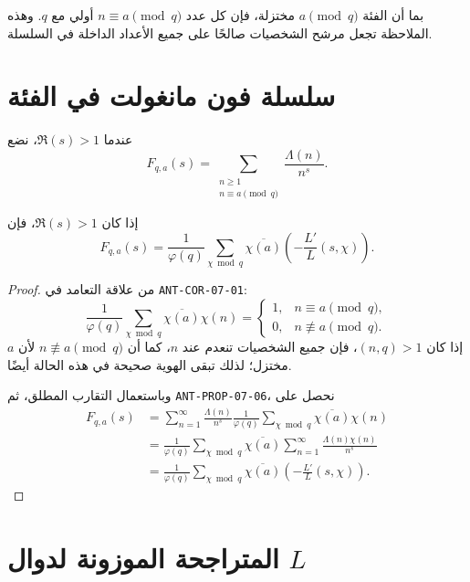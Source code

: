 بما أن الفئة \(a\pmod q\) مختزلة، فإن كل عدد \(n\equiv a\pmod q\)
أولي مع \(q\). وهذه الملاحظة تجعل مرشح الشخصيات صالحًا على جميع الأعداد
الداخلة في السلسلة.

\section{سلسلة فون مانغولت في الفئة}

عندما \(\Re(s)>1\)، نضع
\[
F_{q,a}(s)
=
\sum_{\substack{n\ge1\\n\equiv a\pmod q}}
\frac{\Lambda(n)}{n^s}.
\]

\begin{proposition}
\label{prop:class-von-mangoldt-dirichlet-series}
\provedhere
إذا كان \(\Re(s)>1\)، فإن
\[
F_{q,a}(s)
=
\frac1{\varphi(q)}
\sum_{\chi\bmod q}
\overline{\chi(a)}
\left(-\frac{L'}{L}(s,\chi)\right).
\]
\end{proposition}

\begin{proof}
من علاقة التعامد في \textenglish{\texttt{ANT-COR-07-01}}:
\[
\frac1{\varphi(q)}
\sum_{\chi\bmod q}\overline{\chi(a)}\chi(n)
=
\begin{cases}
1,& n\equiv a\pmod q,\\
0,& n\not\equiv a\pmod q.
\end{cases}
\]
إذا كان \((n,q)>1\)، فإن جميع الشخصيات تنعدم عند \(n\)، كما أن
\(n\not\equiv a\pmod q\) لأن \(a\) مختزل؛ لذلك تبقى الهوية صحيحة في هذه
الحالة أيضًا.

وباستعمال التقارب المطلق، ثم
\textenglish{\texttt{ANT-PROP-07-06}}، نحصل على
\begin{align*}
F_{q,a}(s)
&=
\sum_{n=1}^{\infty}
\frac{\Lambda(n)}{n^s}
\frac1{\varphi(q)}
\sum_{\chi\bmod q}\overline{\chi(a)}\chi(n)\\
&=
\frac1{\varphi(q)}
\sum_{\chi\bmod q}\overline{\chi(a)}
\sum_{n=1}^{\infty}\frac{\Lambda(n)\chi(n)}{n^s}\\
&=
\frac1{\varphi(q)}
\sum_{\chi\bmod q}\overline{\chi(a)}
\left(-\frac{L'}{L}(s,\chi)\right).
\end{align*}
\end{proof}

\section{المتراجحة الموزونة لدوال \(L\)}


